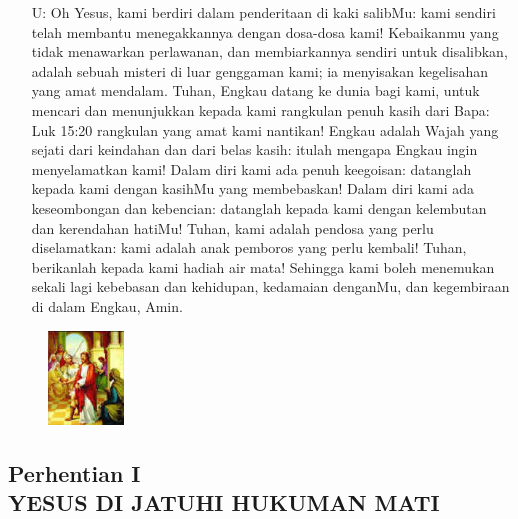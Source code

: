 \documentclass[a5paper,headsepline,titlepage,11pt,nnormalheadings,DIVcalc]{scrbook}
\newcommand{\BU}[1]{\begin{itemize} \item[U:] #1 \end{itemize}}
\begin{document}
\BU{Oh Yesus, kami berdiri dalam penderitaan di kaki salibMu: kami sendiri telah membantu menegakkannya dengan dosa-dosa kami! Kebaikanmu yang tidak menawarkan perlawanan, dan membiarkannya sendiri untuk disalibkan, adalah sebuah misteri di luar genggaman kami; ia menyisakan kegelisahan yang amat mendalam. Tuhan, Engkau datang ke dunia bagi kami, untuk mencari dan menunjukkan kepada kami rangkulan penuh kasih dari Bapa:
 Luk 15:20 rangkulan yang amat kami nantikan! Engkau adalah Wajah yang sejati dari keindahan dan dari belas kasih: itulah mengapa Engkau ingin menyelamatkan kami! Dalam diri kami ada penuh keegoisan: datanglah kepada kami dengan kasihMu yang membebaskan! Dalam diri kami ada keseombongan dan kebencian: datanglah kepada kami dengan kelembutan dan kerendahan hatiMu! Tuhan, kami adalah pendosa yang perlu diselamatkan: kami adalah anak pemboros yang perlu kembali! Tuhan, berikanlah kepada kami hadiah air mata! Sehingga kami boleh menemukan sekali lagi kebebasan dan kehidupan, kedamaian denganMu, dan kegembiraan di dalam Engkau, Amin.} 


\begin{figure}
\includegraphics[width=2cm]{jalansalib_files/01_small.jpg}
\end{figure}
\subsection*{Perhentian I \\
YESUS DI JATUHI HUKUMAN MATI}
\end{document}
